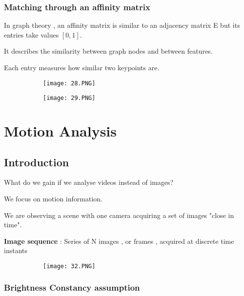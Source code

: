 \documentclass{article}
\begin{document}
\vspace{70mm}

\subsubsection{Matching through an affinity matrix}

In graph theory , an affinity matrix is similar to an adjacency matrix E but its entries take values $[0,1]$.

It describes the similarity between graph nodes and between features.

Each entry measures how similar two keypoints are.


\begin{figure}[ht!]
  \centering
  \begin{subfigure}[b]{0.5\linewidth}
    \texttt{[image: 28.PNG]}
  \end{subfigure}
     \begin{subfigure}[b]{0.49\textwidth}
         \centering
         \texttt{[image: 29.PNG]}
     \end{subfigure}
\end{figure}


\section{Motion Analysis}

\subsection{Introduction}

What do we gain if we analyse videos instead of images?

We focus on motion information.

We are observing a scene with one camera acquiring a set of images "close in time".

\textbf{Image sequence} : Series of N images , or frames , acquired at discrete time instants

\begin{figure}[ht!]
  \centering
  \begin{subfigure}[b]{0.7\linewidth}
    \texttt{[image: 32.PNG]}
  \end{subfigure}
\end{figure}

\subsubsection{Brightness Constancy assumption}
\end{document}
